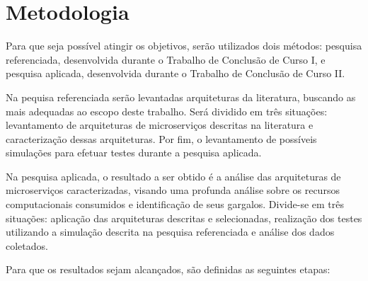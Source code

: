 \section{Metodologia}
\label{met}

Para que seja poss\'{i}vel atingir os objetivos, serão utilizados dois métodos: pesquisa referenciada, desenvolvida durante o Trabalho de Conclusão de Curso I, e pesquisa aplicada, desenvolvida durante o Trabalho de Conclusão de Curso II.

Na pequisa referenciada serão levantadas arquiteturas da literatura, buscando as mais adequadas ao escopo deste trabalho. Será dividido em três situações: levantamento de arquiteturas de microserviços descritas na literatura e caracterização dessas arquiteturas. Por fim, o levantamento de possíveis simulações para efetuar testes durante a pesquisa aplicada.

Na pesquisa aplicada, o resultado a ser obtido é a análise das arquiteturas de microserviços caracterizadas, visando uma profunda análise sobre os recursos computacionais consumidos e identificação de seus gargalos. Divide-se em três situações: aplicação das arquiteturas descritas e selecionadas, realização dos testes utilizando a simulação descrita na pesquisa referenciada e análise dos dados coletados.

Para que os resultados sejam alcançados, são definidas as seguintes etapas:

